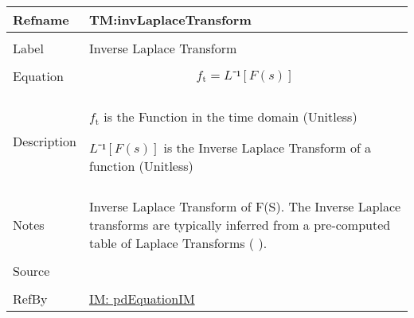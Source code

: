 \documentclass[12pt]{article}
\begin{document}
\vspace{\baselineskip}
\noindent
\begin{minipage}{\textwidth}
\begin{tabular}{>{\raggedright}p{}>{\raggedright\arraybackslash}p{}}
\toprule \textbf{Refname} & \textbf{TM:invLaplaceTransform}
\label{TM:invLaplaceTransform}
\\ \midrule \\
Label & Inverse Laplace Transform
        
\\ \midrule \\
Equation & \begin{displaymath}
           {f_{\text{t}}}=L⁻¹[F(s)]
           \end{displaymath}
\\ \midrule \\
Description & \begin{symbDescription}
              \item{${f_{\text{t}}}$ is the Function in the time domain (Unitless)}
              \item{$L⁻¹[F(s)]$ is the Inverse Laplace Transform of a function (Unitless)}
              \end{symbDescription}
\\ \midrule \\
Notes & Inverse Laplace Transform of F(S). The Inverse Laplace transforms are  typically inferred from a pre-computed table of Laplace Transforms  ( \cite{laplaceWiki} ).
        
\\ \midrule \\
Source & \cite{laplaceWiki}
         
\\ \midrule \\
RefBy & \hyperref[IM:pdEquationIM]{IM: pdEquationIM}
        
\\ \bottomrule
\end{tabular}
\end{minipage}
\vspace{\baselineskip}
\noindent
\end{document}
